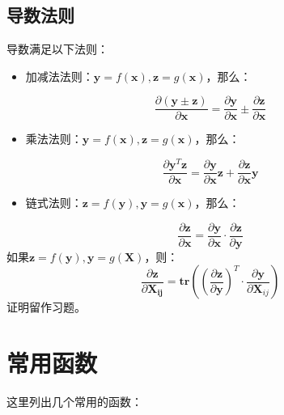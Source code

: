 \documentclass[11pt,fleqn, UTF8]{ctexbook} %
\begin{document}
\subsection{导数法则}
导数满足以下法则：
\begin{itemize}
  \item 加减法法则：$\boldsymbol{y}=f(\boldsymbol{x}),\boldsymbol{z}=g(\boldsymbol{x})$，那么：
\end{itemize}
\begin{equation}\label{2.13}
  \frac{\partial (\boldsymbol{y}\pm\boldsymbol{z})}{\partial \boldsymbol{x}}=\frac{\partial \boldsymbol{y}}{\partial \boldsymbol{x}}\pm\frac{\partial \boldsymbol{z}}{\partial \boldsymbol{x}}
\end{equation}
\begin{itemize}
  \item 乘法法则：$\boldsymbol{y}=f(\boldsymbol{x}),\boldsymbol{z}=g(\boldsymbol{x})$，那么：
\end{itemize}
\begin{equation}\label{2.14}
  \frac{\partial\boldsymbol{y}^T\boldsymbol{z}}{\partial\boldsymbol{x}}=\frac{\partial\boldsymbol{y}}{\partial\boldsymbol{x}}\boldsymbol{z}+\frac{\partial\boldsymbol{z}}{\partial\boldsymbol{x}}\boldsymbol{y}
\end{equation}
\begin{itemize}
  \item 链式法则：$\boldsymbol{z}=f(\boldsymbol{y}),\boldsymbol{y}=g(\boldsymbol{x})$，那么：
\end{itemize}
\begin{equation}\label{2.15}
  \frac{\partial \boldsymbol{z}}{\partial \boldsymbol{x}}=\frac{\partial \boldsymbol{y}}{\partial \boldsymbol{x}}\cdot\frac{\partial \boldsymbol{z}}{\partial \boldsymbol{y}}
\end{equation}
如果$\boldsymbol{z}=f(\boldsymbol{y}),\boldsymbol{y}=g(\boldsymbol{X})$，则：
\begin{equation}\label{2.16}
  \frac{\partial \boldsymbol{z}}{\partial \boldsymbol{X_{ij}}}=\boldsymbol{tr}\left(\left(\frac{\partial \boldsymbol{z}}{\partial \boldsymbol{y}}\right)^T\cdot\frac{\partial \boldsymbol{y}}{\partial \boldsymbol{X}_{ij}}\right)
\end{equation}
证明留作习题。
\section{常用函数}
这里列出几个常用的函数：
\end{document}
